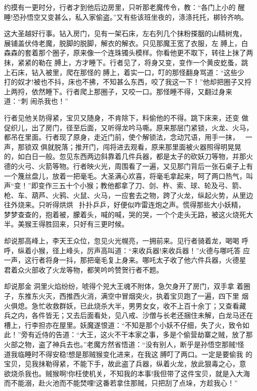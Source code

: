约摸有一更时分，行者才到他后边房里，只听那老魔传令，教：“各门上小的
醒睡!恐孙悟空又变甚么，私入家偷盗。”又有些该班坐夜的，涤涤托托，梆铃齐响。

这大圣越好行事。钻入房门，见有一架石床，左右列几个抹粉搽胭的山精树鬼，
展铺盖伏侍老魔，脱脚的脱脚，解衣的解衣。只见那魔王宽了衣服，左膊上，白
森森的套着那个圈子，原来像一个连珠镯头模样。你看他更不取下，转往上抹了两
抹，紧紧的勒在膊上，方才睡下。行者见了，将身又变，变作一个黄皮虼蚤，跳
上石床，钻入被里，爬在那怪的膊上，着实一口，叮的那怪翻身骂道：“这些少
打的奴才!被也不抖，床也不拂，不知甚么东西，咬了我这一下！”他却把圈子又捋
上两捋，依然睡下。行者爬上那圈子，又咬一口。那怪睡不得，又翻过身来道：“刺
闹杀我也！”

行者见他关防得紧，宝贝又随身，不肯除下，料偷他的不得。跳下床来，还变
做促织儿，出了房门，径至后面，又听得龙吟马嘶。原来那层门紧锁，火龙、火马，
都吊在里面。行者现了原身，走近门前，使个解锁法，念动咒语，用手一抹，
一声，那锁双俱就脱落；推开门，闯将进去观看，原来那里面被火器照得明晃晃
的，如白日一般。忽见东西两边斜靠着几件兵器，都是太子的砍妖刀等物，并那火
德的火弓、火箭等物。行者映火光，周围看了一遍，又见那门背后一张石桌子上有
一个篾丝盘儿，放着一把毫毛。大圣满心欢喜，将毫毛拿起来，呵了两口热气，叫
声“变！”即变作三五十个小猴；教他都拿了刀、剑、杵、索、球、轮及弓、箭、
枪、车、葫芦、火鸦、火鼠、火马，一应套去之物，跨了火龙，纵起火势，从里边
往外烧来。只听得烘烘，扑扑乒乒，好便似咋雷连炮之声。慌得那些大小妖精，
梦梦查查的，抱着被，朦着头，喊的喊，哭的哭，一个个走头无路，被这火烧死大
半。美猴王得胜回来，只好有三更时候。

却说那高峰上，李天王众位，忽见火光幌亮，一拥前来。见行者骑着龙，喝喝
呼呼，纵着小猴，径上峰头，厉声高叫道：“来收兵器!来收兵器！”火德与哪吒答
应一声，这行者将身一抖，那把毫毛复上身来。哪吒太子收了他六件兵器，火德星
君着众火部收了火龙等物，都笑吟吟赞贺行者不题。

却说那金洞里火焰纷纷，唬得个兕大王魂不附体，急欠身开了房门，双手拿
着圈子，东推东火灭，西推西火消，满空中冒烟突火，执着宝贝跑了一遍，四下里
烟火俱熄。急忙收救群妖，已此烧杀大半，男男女女，收不上百十余丁；又查看藏
兵之内，各件皆无；又去后面看处，见八戒、沙僧与长老还捆住未解，白龙马还在
槽上，行李担亦在屋里。妖魔遂恨道：“不知是那个小妖不仔细，失了火，致令如
此！”旁有近侍的告道：“大王，这火不干本家之事，多是个偷营劫寨之贼，放了那
火部之物，盗了神兵去也。”老魔方然省悟道：“没有别人，断乎是孙悟空那贼!怪
道我临睡时不得安稳!想是那贼猴变化进来，在我这膊叮了两口。一定是要偷我
的宝贝，见我抹勒得紧，不能下手，故此盗了兵器，纵着火龙，放此狠毒之心，意
欲烧杀我也。贼猴啊!你枉使机关，不知我的本事!我但带了这件宝贝，就是入大海
而不能溺，赴火池而不能焚哩!这番若拿住那贼，只把刮了点垛，方趁我心！”

